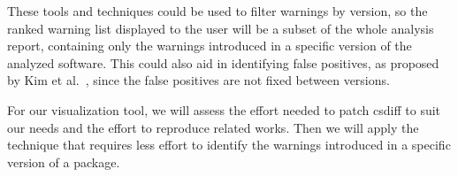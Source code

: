 These tools and techniques could be used to filter warnings by version, so the
ranked warning list displayed to the user will be a subset of the whole
analysis report, containing only the warnings introduced in a specific version
of the analyzed software. This could also aid in identifying false positives,
as proposed by Kim et al.~\cite{kim_which_2007}, since the false positives are
not fixed between versions.

For our visualization tool, we will assess the effort needed to patch csdiff
to suit our needs and the effort to reproduce related works. Then we will
apply the technique that requires less effort to identify the warnings introduced
in a specific version of a package.

